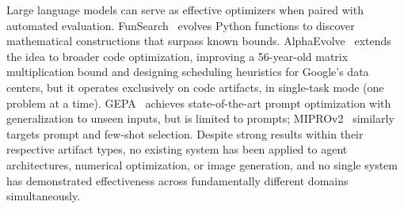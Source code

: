 \documentclass[sigconf,anonymous,review]{acmart}
\begin{document}
Large language models can serve as effective optimizers when paired with automated evaluation. FunSearch~\cite{romera2024funsearch} evolves Python functions to discover mathematical constructions that surpass known bounds. AlphaEvolve~\cite{alphaevolve2025} extends the idea to broader code optimization, improving a 56-year-old matrix multiplication bound and designing scheduling heuristics for Google's data centers, but it operates exclusively on code artifacts, in single-task mode (one problem at a time).
GEPA~\cite{agrawal2026gepa} achieves state-of-the-art prompt optimization with generalization to unseen inputs, but is limited to prompts; MIPROv2~\cite{opsahl2024miprov2} similarly targets prompt and few-shot selection.
Despite strong results within their respective artifact types, no existing system has been applied to agent architectures, numerical optimization, or image generation, and no single system has demonstrated effectiveness across fundamentally different domains simultaneously.


\end{document}
